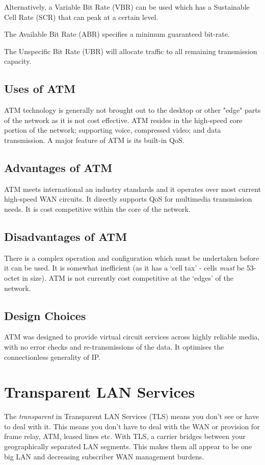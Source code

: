 Alternatively, a Variable Bit Rate (VBR) can be used which has a Sustainable Cell Rate (SCR) that can peak at a certain level. 

The Available Bit Rate (ABR) specifies a minimum guaranteed bit-rate.

The Unspecific Bit Rate (UBR) will allocate traffic to all remaining transmission capacity.

\subsection*{Uses of ATM}
ATM technology is generally not brought out to the desktop or other "edge" parts of the network as it is not cost effective. ATM resides in the high-speed core portion of the network; supporting voice, compressed video; and data transmission. A major feature of ATM is its built-in QoS.

\subsection*{Advantages of ATM}
ATM meets international an industry standards and it operates over most current high-speed WAN circuits. It directly supports QoS for multimedia transmission needs. It is cost competitive within the core of the network.

\subsection*{Disadvantages of ATM}
There is a complex operation and configuration which must be undertaken before it can be used. It is somewhat inefficient (as it has a `cell tax' - cells \textit{must} be 53-octet in size). ATM is not currently cost competitive at the `edges' of the network. 

\subsection*{Design Choices}
ATM was designed to provide virtual circuit services across highly reliable media, with no error checks and re-transmissions of the data. It optimises the connectionless generality of IP.


\section*{Transparent LAN Services}
The \textit{transparent} in Transparent LAN Services (TLS) means you don't see or have to deal with it. This means you don't have to deal with the WAN or provision for frame relay, ATM, leased lines etc. With TLS, a carrier bridges between your geographically separated LAN segments. This makes them all appear to be one big LAN and decreasing subscriber WAN management burdens.

